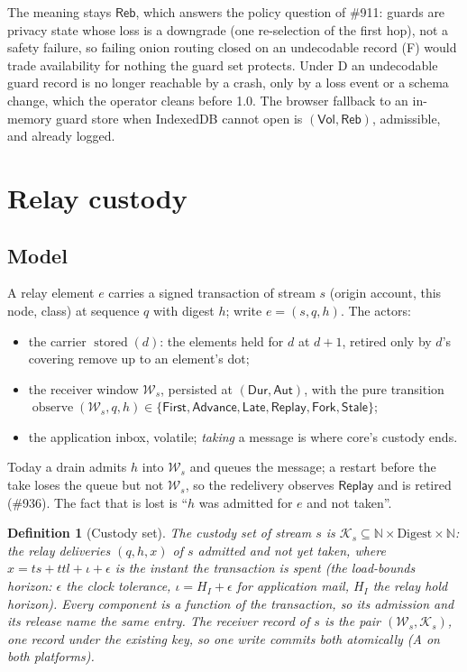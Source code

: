 \documentclass[journal]{IEEEtran}
\newtheorem{definition}{Definition}
\newcommand{\obs}{\operatorname{observe}}
\newcommand{\stored}{\operatorname{stored}}
\newcommand{\Volatile}{\mathsf{Vol}}
\newcommand{\Durable}{\mathsf{Dur}}
\newcommand{\Rebuild}{\mathsf{Reb}}
\newcommand{\Auth}{\mathsf{Aut}}
\newcommand{\K}{\mathcal{K}}
\newcommand{\W}{\mathcal{W}}
\newcommand{\issue}[1]{\#{#1}}
\begin{document}
The meaning stays $\Rebuild$, which answers the policy question of \issue{911}: guards are
privacy state whose loss is a downgrade (one re-selection of the first hop), not a safety
failure, so failing onion routing closed on an undecodable record (F) would trade
availability for nothing the guard set protects.  Under D an undecodable guard record is no
longer reachable by a crash, only by a loss event or a schema change, which the operator
cleans before 1.0.  The browser fallback to an in-memory guard store when IndexedDB cannot
open is $(\Volatile,\Rebuild)$, admissible, and already logged.

\section{Relay custody}\label{sec:custody}

\subsection{Model}

A relay element $e$ carries a signed transaction of stream $s$ (origin account, this node,
class) at sequence $q$ with digest $h$; write $e=(s,q,h)$.  The actors:
\begin{itemize}[leftmargin=1.2em]
\item the carrier $\stored(d)$: the elements held for $d$ at $d+1$, retired only by $d$'s
covering remove up to an element's dot;
\item the receiver window $\W_s$, persisted at $(\Durable,\Auth)$, with the pure transition
$\obs(\W_s,q,h)\in\{\mathsf{First},\mathsf{Advance},\mathsf{Late},\mathsf{Replay},
\mathsf{Fork},\mathsf{Stale}\}$;
\item the application inbox, volatile; \emph{taking} a message is where core's custody
ends.
\end{itemize}
Today a drain admits $h$ into $\W_s$ and queues the message; a restart before the take
loses the queue but not $\W_s$, so the redelivery observes $\mathsf{Replay}$ and is
retired (\issue{936}).  The fact that is lost is ``$h$ was admitted for $e$ and not taken''.

\begin{definition}[Custody set]\label{def:custody}
The custody set of stream $s$ is $\K_s\subseteq\mathbb{N}\times\mathrm{Digest}\times
\mathbb{N}$: the relay deliveries $(q,h,x)$ of $s$ admitted and not yet taken, where
$x=\mathit{ts}+\mathit{ttl}+\iota+\epsilon$ is the instant the transaction is spent (the
load-bounds horizon: $\epsilon$ the clock tolerance, $\iota=H_I+\epsilon$ for application
mail, $H_I$ the relay hold horizon).  Every component is a
function of the transaction, so its admission and its release name the same entry.  The
receiver record of $s$ is the pair $(\W_s,\K_s)$, one record under the existing key, so one
write commits both atomically (A on both platforms).
\end{definition}
\end{document}
